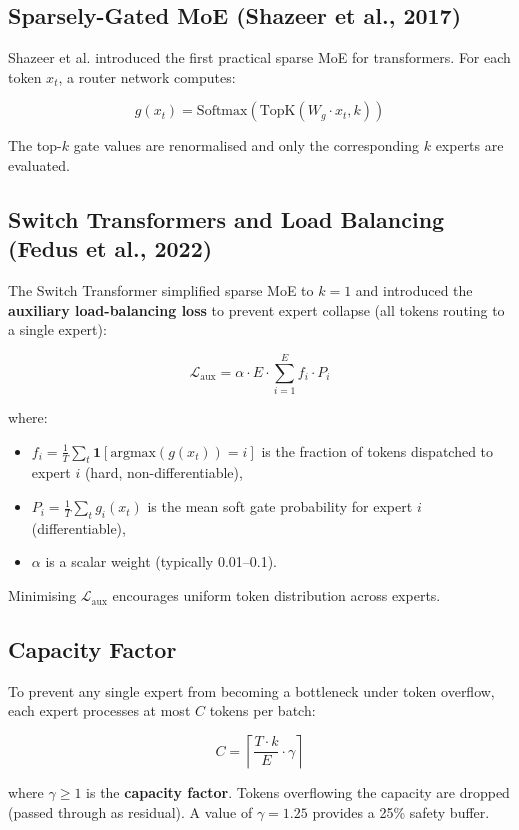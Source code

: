 \documentclass[11pt]{article}
\begin{document}
\subsection{Sparsely-Gated MoE (Shazeer et al., 2017)}


Shazeer et al. introduced the first practical sparse MoE for transformers. For each token $x_t$, a router network computes:


$$g(x_t) = \text{Softmax}(\text{TopK}(W_g \cdot x_t, k))$$


The top-$k$ gate values are renormalised and only the corresponding $k$ experts are evaluated.


\subsection{Switch Transformers and Load Balancing (Fedus et al., 2022)}


The Switch Transformer simplified sparse MoE to $k=1$ and introduced the \textbf{auxiliary load-balancing loss} to prevent expert collapse (all tokens routing to a single expert):


$$\mathcal{L}_{\text{aux}} = \alpha \cdot E \cdot \sum_{i=1}^{E} f_i \cdot P_i$$


where:

\begin{itemize}[leftmargin=*]
\item $f_i = \frac{1}{T}\sum_t \mathbf{1}[\text{argmax}(g(x_t)) = i]$ is the fraction of tokens dispatched to expert $i$ (hard, non-differentiable),
\item $P_i = \frac{1}{T}\sum_t g_i(x_t)$ is the mean soft gate probability for expert $i$ (differentiable),
\item $\alpha$ is a scalar weight (typically 0.01–0.1).

\end{itemize}
Minimising $\mathcal{L}_{\text{aux}}$ encourages uniform token distribution across experts.


\subsection{Capacity Factor}


To prevent any single expert from becoming a bottleneck under token overflow, each expert processes at most $C$ tokens per batch:


$$C = \left\lceil \frac{T \cdot k}{E} \cdot \gamma \right\rceil$$


where $\gamma \geq 1$ is the \textbf{capacity factor}. Tokens overflowing the capacity are dropped (passed through as residual). A value of $\gamma = 1.25$ provides a 25\% safety buffer.
\end{document}
